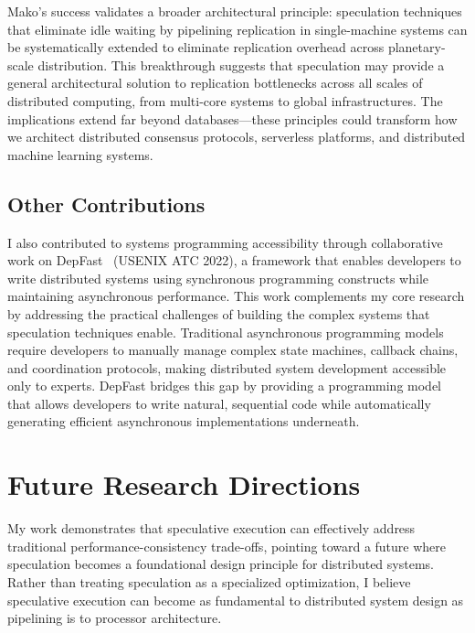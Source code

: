 \documentclass[11pt,letterpaper]{article}
\begin{document}
Mako's success validates a broader architectural principle: speculation techniques that eliminate idle waiting by pipelining replication in single-machine systems can be systematically extended to eliminate replication overhead across planetary-scale distribution. 
This breakthrough suggests that speculation may provide a general architectural solution to replication bottlenecks across all scales of distributed computing, from multi-core systems to global infrastructures. 
The implications extend far beyond databases—these principles could transform how we architect distributed consensus protocols, serverless platforms, and distributed machine learning systems.

\subsection{Other Contributions}
I also contributed to systems programming accessibility through collaborative work on DepFast~\cite{luo2022depfast} (USENIX ATC 2022), a framework that enables developers to write distributed systems using synchronous programming constructs while maintaining asynchronous performance. This work complements my core research by addressing the practical challenges of building the complex systems that speculation techniques enable.
Traditional asynchronous programming models require developers to manually manage complex state machines, callback chains, and coordination protocols, making distributed system development accessible only to experts. 
DepFast bridges this gap by providing a programming model that allows developers to write natural, sequential code while automatically generating efficient asynchronous implementations underneath. 

\section{Future Research Directions}
My work demonstrates that speculative execution can effectively address traditional performance-consistency trade-offs, pointing toward a future where speculation becomes a foundational design principle for distributed systems. Rather than treating speculation as a specialized optimization, I believe speculative execution can become as fundamental to distributed system design as pipelining is to processor architecture.
\end{document}
